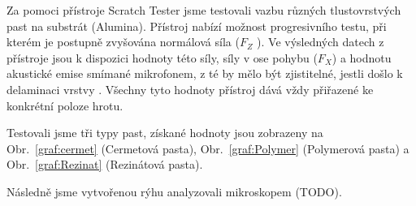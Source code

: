 Za pomoci přístroje Scratch Tester jsme testovali vazbu různých tlustovrstvých past na substrát (Alumina). Přístroj nabízí možnost progresivního testu, při kterém je postupně zvyšována normálová síla (\(F_{Z} \) ). Ve výsledných datech z přístroje jsou k dispozici hodnoty této síly, síly v ose pohybu (\(F_{X} \)) a hodnotu akustické emise smímané mikrofonem, z té by mělo být zjistitelné, jestli došlo k delaminaci vrstvy \cite{DiplomkaScratchTester}. Všechny tyto hodnoty přístroj dává vždy přiřazené ke konkrétní poloze hrotu. 

Testovali jsme tři typy past, získané hodnoty jsou zobrazeny na Obr.~\ref{graf:cermet} (Cermetová pasta), Obr.~\ref{graf:Polymer} (Polymerová pasta) a Obr.~\ref{graf:Rezinat} (Rezinátová pasta).

Následně jsme vytvořenou rýhu analyzovali mikroskopem (TODO). 

\begin{figure*}[h!]
    \caption{Scratch test -- Cermet.}
    \label{graf:cermet}
\end{figure*}

